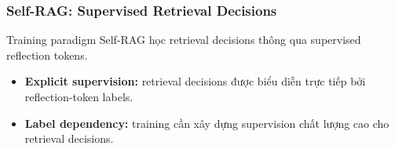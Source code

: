 
\begin{frame}
    \frametitle{Self-RAG: Supervised Retrieval Decisions}

    \small

    \begin{block}{Training paradigm}
        Self-RAG học retrieval decisions thông qua
        supervised reflection tokens.
    \end{block}

    \vspace{0.1cm}

    \begin{center}
    \end{center}

    \vspace{0.12cm}

    \begin{itemize}
        \setlength{\itemsep}{3pt}

        \item \textbf{Explicit supervision:}
        retrieval decisions được biểu diễn trực tiếp bởi
        reflection-token labels.

        \item \textbf{Label dependency:}
        training cần xây dựng supervision chất lượng cao
        cho retrieval decisions.


\end{itemize}
\end{frame}
